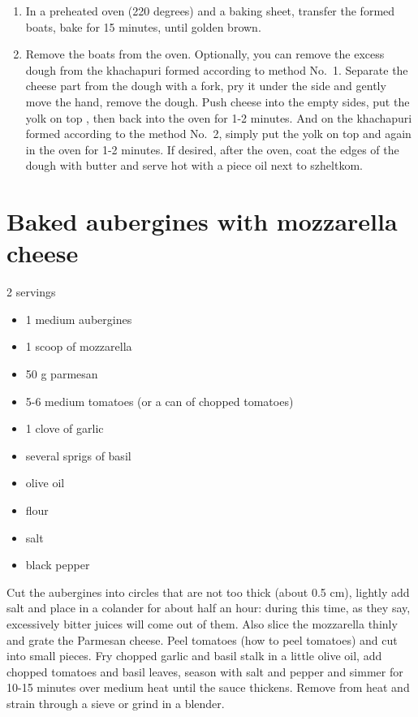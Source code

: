 \documentclass[
]{book}
\providecommand{\tightlist}{%
  \setlength{\itemsep}{0pt}\setlength{\parskip}{0pt}}
\begin{document}
\begin{enumerate}
\def\labelenumi{\arabic{enumi}.}
\setcounter{enumi}{5}
\tightlist
\item
  In a preheated oven (220 degrees) and a baking sheet, transfer the formed boats, bake for 15 minutes, until golden brown.
\item
  Remove the boats from the oven. Optionally, you can remove the excess dough from the khachapuri formed according to method No.~1. Separate the cheese part from the dough with a fork, pry it under the side and gently move the hand, remove the dough. Push cheese into the empty sides, put the yolk on top , then back into the oven for 1-2 minutes. And on the khachapuri formed according to the method No.~2, simply put the yolk on top and again in the oven for 1-2 minutes. If desired, after the oven, coat the edges of the dough with butter and serve hot with a piece oil next to szheltkom.
\end{enumerate}

\hypertarget{baked-aubergines-with-mozzarella-cheese}{%
\section{Baked aubergines with mozzarella cheese}\label{baked-aubergines-with-mozzarella-cheese}}

2 servings

\begin{itemize}
\tightlist
\item
  1 medium aubergines
\item
  1 scoop of mozzarella
\item
  50 g parmesan
\item
  5-6 medium tomatoes (or a can of chopped tomatoes)
\item
  1 clove of garlic
\item
  several sprigs of basil
\item
  olive oil
\item
  flour
\item
  salt
\item
  black pepper
\end{itemize}

Cut the aubergines into circles that are not too thick (about 0.5 cm), lightly add salt and place in a colander for about half an hour: during this time, as they say, excessively bitter juices will come out of them. Also slice the mozzarella thinly and grate the Parmesan cheese. Peel tomatoes (how to peel tomatoes) and cut into small pieces. Fry chopped garlic and basil stalk in a little olive oil, add chopped tomatoes and basil leaves, season with salt and pepper and simmer for 10-15 minutes over medium heat until the sauce thickens. Remove from heat and strain through a sieve or grind in a blender.
\end{document}
